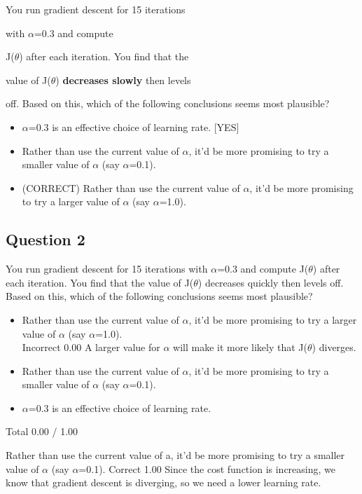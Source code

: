 \documentclass[11pt]{article} %
\begin{document}
	You run gradient descent for 15 iterations
	
	with $\alpha$=0.3 and compute
	
	J($\theta$) after each iteration. You find that the
	
	value of J($\theta$) \textbf{decreases slowly}  then levels
	
	off. Based on this, which of the following conclusions seems most plausible?
	
	
	
\begin{itemize}
	\item 	$\alpha$=0.3 is an effective choice of learning rate.  [YES]
	
	\item Rather than use the current value of $\alpha$, it'd be more promising to try a smaller value of $\alpha$ (say $\alpha$=0.1).
	
	\item (CORRECT) Rather than use the current value of $\alpha$, it'd be more promising to try a larger value of $\alpha$ (say $\alpha$=1.0).
\end{itemize}	

\subsection*{Question 2}
You run gradient descent for 15 iterations with $\alpha$=0.3 and compute J($\theta$) after each iteration. 
You find that the value of J($\theta$) decreases quickly then levels off. Based on this, which of the following conclusions seems most plausible?

\begin{itemize}
	\item Rather than use the current value of $\alpha$, it'd be more promising to try a larger value of $\alpha$ (say $\alpha$=1.0).
	\\ Incorrect	0.00	 A larger value for $\alpha$ will make it more likely that J($\theta$) diverges.
	\item Rather than use the current value of $\alpha$, it'd be more promising to try a smaller value of $\alpha$ (say $\alpha$=0.1).			
	\item $\alpha$=0.3 is an effective choice of learning rate.			
\end{itemize}
Total		0.00 / 1.00	

Rather than use the current value of a, it'd be more promising to try a smaller value of $\alpha$ (say $\alpha$=0.1).	Correct	1.00	 
Since the cost function is increasing, we know that gradient descent is diverging, so we need a lower learning rate.
\end{document}
